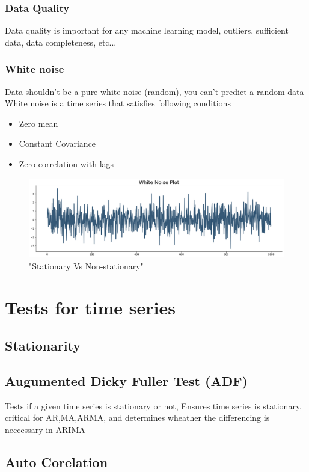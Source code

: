 \documentclass[12pt]{extarticle}
\begin{document}
\subsubsection{Data Quality}
Data quality is important for any machine learning model, outliers, sufficient
data, data completeness, etc...

\subsubsection{White noise}
Data shouldn't be a pure white noise (random), you can't predict a random data \\
White noise is a time series that satisfies following conditions
\begin{itemize}
    \item Zero mean
    \item Constant Covariance 
    \item Zero correlation with lags
\end{itemize}

\begin{figure}[H]
    \centering
    \includegraphics[width=0.5\linewidth]{images/timeseries3.png}
    \caption{"Stationary Vs Non-stationary"}
    \label{fig:enter-label}
\end{figure}

\section{Tests for time series}

\subsection*{Stationarity}
\subsection{Augumented Dicky Fuller Test (ADF)}
Tests if a given time series is stationary or not, Ensures time series
is stationary, critical for AR,MA,ARMA, and determines wheather the 
differencing is neccessary in ARIMA


\subsection*{Auto Corelation}
\end{document}

